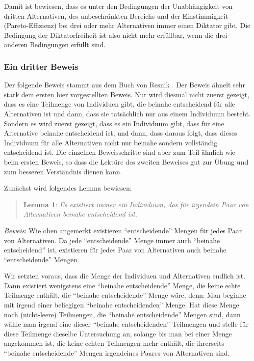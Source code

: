 Damit ist bewiesen, dass es unter den Bedingungen der Unabhängigkeit von
dritten Alternativen, des unbeschränkten Bereichs und der Einstimmigkeit
(Pareto-Effizienz) bei drei oder mehr Alternativen immer einen Diktator gibt.
Die Bedingung der Diktatorfreiheit ist also nicht mehr erfüllbar, wenn die drei
anderen Bedingungen erfüllt sind.


\subsubsection{Ein dritter Beweis}

Der folgende Beweis stammt aus dem Buch von Resnik \cite[S. 186ff.]{resnik:1987}.
Der Beweis ähnelt sehr stark dem ersten hier vorgestellten Beweis.
Nur wird diesmal nicht zuerst gezeigt, dass es
eine Teilmenge von Individuen gibt, die beinahe entscheidend für alle
Alternativen ist und dann, dass sie tatsächlich nur aus einem Individuum besteht.
Sondern es wird zuerst gezeigt, dass es ein Individuum gibt, dass für eine
Alternative beinahe entscheidend ist, und dann, dass daraus folgt, dass dieses
Individuum für alle Alternativen nicht nur beinahe sondern vollständig
entscheidend ist. Die einzelnen Beweisschritte sind aber zum Teil ähnlich wie
beim ersten Beweis, so dass die Lektüre des zweiten Beweises gut zur Übung und
zum besseren Verständnis dienen kann.

Zunächst wird folgendes Lemma bewiesen: 

\begin{quote}
{\bf Lemma 1}: {\em Es existiert immer ein Individuum, das für irgendein Paar
von Alternativen beinahe entscheidend ist.}
\end{quote} 

{\em Beweis}: Wie oben angemerkt existieren "`entscheidende"' Mengen für jedes
Paar von Alternativen. Da jede "`entscheidende"' Menge immer auch "`beinahe
entscheidend"' ist, existieren für jedes Paar von Alternativen auch beinahe
"`entscheidende"' Mengen. 

Wir setzten voraus, dass die Menge der Individuen und Alternativen endlich ist.
Dann existiert wenigstens eine "`beinahe entscheidende"' Menge, die keine echte
Teilmenge enthält, die "`beinahe entscheidende"' Menge wäre, denn: Man beginne
mit irgend einer beliegigen "`beinahe entscheidenden"' Menge. Hat diese Menge
noch (nicht-leere) Teilmengen, die "`beinahe entscheidende"' Mengen sind, dann
wähle man irgend eine dieser "`beinahe entscheidenden"' Teilmengen und stelle für
diese Teilmenge dieselbe Untersuchung an, solange bis man bei einer Menge
angekommen ist, die keine echten Teilmengen mehr enthält, die ihrerseits
"`beinahe entscheidende"' Mengen irgendeines Paares von Alternativen sind.

